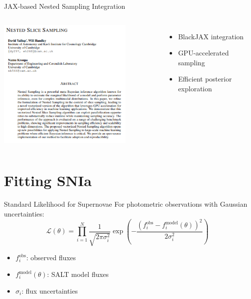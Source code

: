 \documentclass[aspectratio=169]{beamer}
\begin{document}
\begin{frame}{JAX-based Nested Sampling Integration}
  \begin{columns}
      \centering
      \includegraphics[width=0.8\textwidth]{images/nested_sampling_paper.png}
      \begin{itemize}
        \item BlackJAX integration
        \item GPU-accelerated sampling
        \item Efficient posterior exploration
      \end{itemize}
  \end{columns}
\end{frame}

\section{Fitting SNIa}

\begin{frame}{Standard Likelihood for Supernovae}
  \centering
  For photometric observations with Gaussian uncertainties:
  \begin{equation*}
    \mathcal{L}(\theta) = \prod_{i=1}^{N} \frac{1}{\sqrt{2\pi\sigma_i^2}} \exp\left(-\frac{(f_i^{\text{obs}} - f_i^{\text{model}}(\theta))^2}{2\sigma_i^2}\right)
  \end{equation*}
  \begin{itemize}
    \item $f_i^{\text{obs}}$: observed fluxes
    \item $f_i^{\text{model}}(\theta)$: SALT model fluxes 
    \item $\sigma_i$: flux uncertainties
  \end{itemize}
\end{frame}
\end{document}
